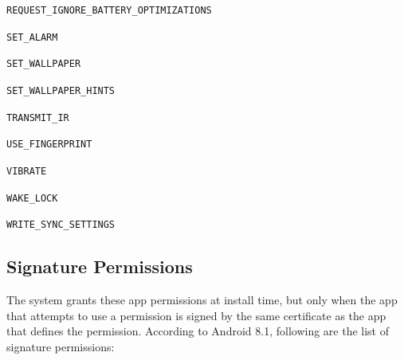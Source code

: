 \begin{itemize}
\begin{spacing}{0.9}
    \item \texttt{REQUEST\_IGNORE\_BATTERY\_OPTIMIZATIONS}
    \item \texttt{SET\_ALARM}
    \item \texttt{SET\_WALLPAPER}
    \item \texttt{SET\_WALLPAPER\_HINTS}
    \item \texttt{TRANSMIT\_IR}
    \item \texttt{USE\_FINGERPRINT}
    \item \texttt{VIBRATE}
    \item \texttt{WAKE\_LOCK}
    \item \texttt{WRITE\_SYNC\_SETTINGS}
    \end{spacing}
\end{itemize}
\subsection{Signature Permissions}
The system grants these app permissions at install time, but only when the app that attempts to use a permission is signed by the same certificate as the app that defines the permission. According to Android 8.1, following are the list of signature permissions:
